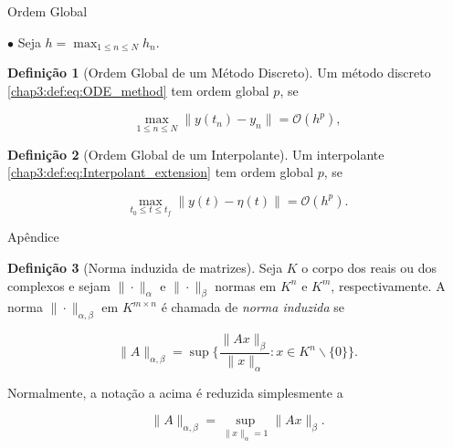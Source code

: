 \documentclass{beamer}
\theoremstyle{plain}
\theoremstyle{definition}
\newtheorem{defi}{Definição}
\begin{document}
\begin{frame}{Ordem Global}

    \phantom{aa} $\bullet$ Seja $h = \max_{1 \leq n \leq N} h_n$.

    \begin{defi}[Ordem Global de um Método Discreto]
        
        Um método discreto \eqref{chap3:def:eq:ODE_method} tem ordem global $p$, se 

        \begin{equation}
            \max_{1 \leq n \leq N} \| y(t_n) - y_n \| = \mathcal{O}(h^p),
        \end{equation}
    \end{defi}


    \begin{defi}[Ordem Global de um Interpolante]
        
        Um interpolante \eqref{chap3:def:eq:Interpolant_extension} tem ordem global $p$, se 

        \begin{equation}
            \max_{t_0 \leq t \leq t_f} \| y(t) - \eta(t) \| = \mathcal{O}(h^{p}).
        \end{equation}
    \end{defi}

\end{frame}

\begin{frame}{Apêndice}
    \begin{defi}[Norma induzida de matrizes]
        \label{apendices:def:induced_matrix_norm}
        Seja $K$ o corpo dos reais ou dos complexos e sejam $\|\cdot\|_\alpha$ e $\|\cdot\|_\beta$ normas em $K^n$ e $K^m$, respectivamente.
        A norma $\| \cdot \|_{\alpha, \beta}$ em $K^{m \times n}$ é chamada de \textit{norma induzida} se 

        \noindent
        \[ \| A \|_{\alpha, \beta} = \sup\{\frac{\|Ax\|_\beta}{\|x\|_\alpha} : x\in K^n \backslash \{0\} \}. \]


        Normalmente, a notação a acima é reduzida simplesmente a 

        \noindent
        \[ \| A \|_{\alpha, \beta} = \sup_{\|x\|_\alpha = 1} \|Ax\|_\beta.\]

    \end{defi}


\end{frame}
\end{document}
